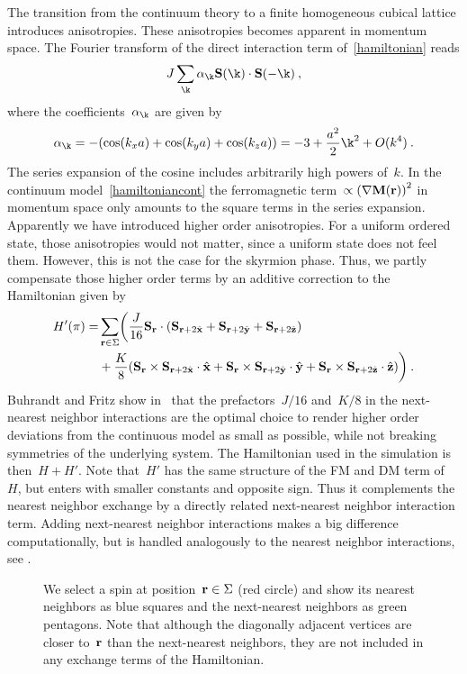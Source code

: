 The transition from the continuum theory to a finite homogeneous cubical lattice
introduces anisotropies. These anisotropies becomes apparent in momentum space.
The Fourier transform of the direct interaction term of~\eqref{hamiltonian}
reads
%
\begin{equation}
  J \sum_{\k} \alpha_{\k} \S (\k) \cdot \S (- \k) \:,
\end{equation}
%
where the coefficients~$\alpha_{\k}$ are given by
%
\begin{equation}
  \alpha_{\k} = - (\cos (k_x a) + \cos (k_y a) + \cos (k_z a) ) =
  -3 + \frac{a^2}{2} \k^2 + O(k^4) \:.
\end{equation}
%
The series expansion of the cosine includes arbitrarily high powers of~$k$. In
the continuum model~\eqref{hamiltoniancont} the ferromagnetic term~$\propto {(
\nabla \mathbf{M}(\mathbf{r}) )}^2$ in momentum space only amounts to the square terms in the
series expansion. Apparently we have introduced higher order anisotropies. For a
uniform ordered state, those anisotropies would not matter, since a uniform
state does not feel them. However, this is not the case for the skyrmion phase.
Thus, we partly compensate those higher order terms by an additive correction to
the Hamiltonian given by
%
\begin{align}\label{hamiltonianfix}
  H'(\pi) = & \sum_{\mathbf{r} \in \Sigma} \biggl(
  \frac{J}{16} \mathbf{S}_{\mathbf{r}} \cdot (\mathbf{S}_{\mathbf{r}+2\hat{\mathbf{x}}} + \mathbf{S}_{\mathbf{r}+2\hat{\mathbf{y}}} + \mathbf{S}_{\mathbf{r}+2\hat{\mathbf{z}}})\nonumber \\
  &+ \frac{K}{8} (\mathbf{S}_{\mathbf{r}} \times \mathbf{S}_{\mathbf{r}+2\hat{\mathbf{x}}} \cdot \hat{\mathbf{x}} +
        \mathbf{S}_{\mathbf{r}} \times \mathbf{S}_{\mathbf{r}+2\hat{\mathbf{y}}} \cdot \hat{\mathbf{y}} +
        \mathbf{S}_{\mathbf{r}} \times \mathbf{S}_{\mathbf{r}+2\hat{\mathbf{z}}} \cdot \hat{\mathbf{z}})\biggr)\:.
\end{align}
%
Buhrandt and Fritz show in~\cite{skyrmion} that the prefactors~$J/16$ and~$K/8$
in the  next-nearest neighbor interactions are the optimal choice to render
higher order deviations from the continuous model as small as possible, while
not breaking symmetries of the underlying system. The Hamiltonian used in the
simulation is then~$H + H'$. Note that~$H'$ has the same structure of the FM and
DM term of~$H$, but enters with smaller constants and opposite sign. Thus it
complements the nearest neighbor exchange by a directly related next-nearest
neighbor interaction term. Adding next-nearest neighbor interactions makes a big
difference computationally, but is handled analogously to the nearest neighbor
interactions, see .

\begin{figure}
  \centering
  \caption{We select a spin at position~$\mathbf{r} \in \Sigma$ (red circle) and show
  its nearest neighbors as blue squares and the next-nearest neighbors as green
  pentagons. Note that although the diagonally adjacent vertices are closer
  to~$\mathbf{r}$ than the next-nearest neighbors, they are not included in any
  exchange terms of the Hamiltonian.}
\label{fig:interact}
\end{figure}

